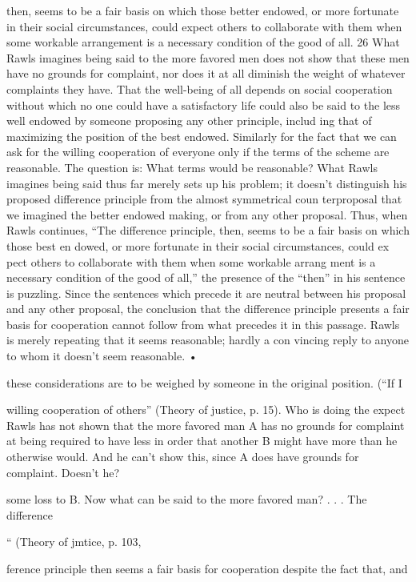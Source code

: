 \documentclass[11pt,openany]{book}
\begin{document}
then, seems to be a fair basis on which those better endowed, or more fortunate in their social circumstances, could expect others to collaborate with them when some workable arrangement is a necessary condition of the good of all. 26 What Rawls imagines being said to the more favored men does not show that these men have no grounds for complaint, nor does it at all diminish the weight of whatever complaints they have. That the well-being of all depends on social cooperation without which no one could have a satisfactory life could also be said to the less well endowed by someone proposing any other principle, includ ing that of maximizing the position of the best endowed. Similarly for the fact that we can ask for the willing cooperation of everyone only if the terms of the scheme are reasonable. The question is: What terms would be reasonable? What Rawls imagines being said thus far merely sets up his problem; it doesn't distinguish his proposed difference principle from the almost symmetrical coun terproposal that we imagined the better endowed making, or from any other proposal. Thus, when Rawls continues, ``The difference principle, then, seems to be a fair basis on which those best en dowed, or more fortunate in their social circumstances, could ex pect others to collaborate with them when some workable arrang ment is a necessary condition of the good of all,'' the presence of the ``then'' in his sentence is puzzling. Since the sentences which precede it are neutral between his proposal and any other proposal, the conclusion that the difference principle presents a fair basis for cooperation cannot follow from what precedes it in this passage. Rawls is merely repeating that it seems reasonable; hardly a con vincing reply to anyone to whom it doesn't seem reasonable. • 

these considerations are to be weighed by someone in the original position. (``If I 

willing cooperation of others'' (Theory of justice, p. 15). Who is doing the expect Rawls has not shown that the more favored man A has no grounds for complaint at being required to have less in order that another B might have more than he otherwise would. And he can't show this, since A does have grounds for complaint. Doesn't he? 

some loss to B. Now what can be said to the more favored man? . . . The difference 

`` (Theory of jmtice, p. 103, 

ference principle then seems a fair basis for cooperation despite the fact that, and 
\end{document}

